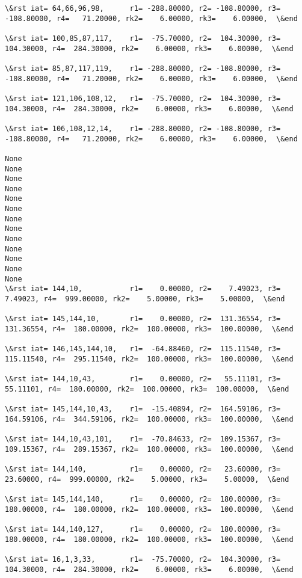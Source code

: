 \documentclass[11pt]{article}
\begin{document}
\begin{Verbatim}[commandchars=\\\{\}]
\&rst iat= 64,66,96,98,      r1= -288.80000, r2= -108.80000, r3= -108.80000, r4=   71.20000, rk2=    6.00000, rk3=    6.00000,  \&end

\&rst iat= 100,85,87,117,    r1=  -75.70000, r2=  104.30000, r3=  104.30000, r4=  284.30000, rk2=    6.00000, rk3=    6.00000,  \&end

\&rst iat= 85,87,117,119,    r1= -288.80000, r2= -108.80000, r3= -108.80000, r4=   71.20000, rk2=    6.00000, rk3=    6.00000,  \&end

\&rst iat= 121,106,108,12,   r1=  -75.70000, r2=  104.30000, r3=  104.30000, r4=  284.30000, rk2=    6.00000, rk3=    6.00000,  \&end

\&rst iat= 106,108,12,14,    r1= -288.80000, r2= -108.80000, r3= -108.80000, r4=   71.20000, rk2=    6.00000, rk3=    6.00000,  \&end

None
None
None
None
None
None
None
None
None
None
None
None
None
\&rst iat= 144,10,           r1=    0.00000, r2=    7.49023, r3=    7.49023, r4=  999.00000, rk2=    5.00000, rk3=    5.00000,  \&end

\&rst iat= 145,144,10,       r1=    0.00000, r2=  131.36554, r3=  131.36554, r4=  180.00000, rk2=  100.00000, rk3=  100.00000,  \&end

\&rst iat= 146,145,144,10,   r1=  -64.88460, r2=  115.11540, r3=  115.11540, r4=  295.11540, rk2=  100.00000, rk3=  100.00000,  \&end

\&rst iat= 144,10,43,        r1=    0.00000, r2=   55.11101, r3=   55.11101, r4=  180.00000, rk2=  100.00000, rk3=  100.00000,  \&end

\&rst iat= 145,144,10,43,    r1=  -15.40894, r2=  164.59106, r3=  164.59106, r4=  344.59106, rk2=  100.00000, rk3=  100.00000,  \&end

\&rst iat= 144,10,43,101,    r1=  -70.84633, r2=  109.15367, r3=  109.15367, r4=  289.15367, rk2=  100.00000, rk3=  100.00000,  \&end

\&rst iat= 144,140,          r1=    0.00000, r2=   23.60000, r3=   23.60000, r4=  999.00000, rk2=    5.00000, rk3=    5.00000,  \&end

\&rst iat= 145,144,140,      r1=    0.00000, r2=  180.00000, r3=  180.00000, r4=  180.00000, rk2=  100.00000, rk3=  100.00000,  \&end

\&rst iat= 144,140,127,      r1=    0.00000, r2=  180.00000, r3=  180.00000, r4=  180.00000, rk2=  100.00000, rk3=  100.00000,  \&end

\&rst iat= 16,1,3,33,        r1=  -75.70000, r2=  104.30000, r3=  104.30000, r4=  284.30000, rk2=    6.00000, rk3=    6.00000,  \&end


\end{Verbatim}
\end{document}
